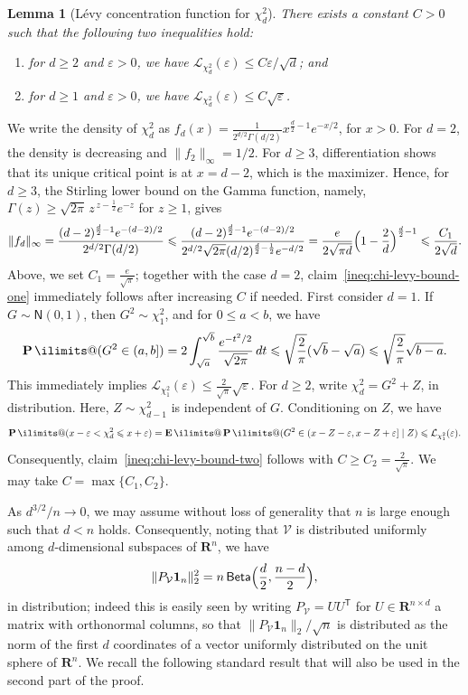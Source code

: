 \documentclass[11pt, letterpaper, hidelinks]{article}
\makeatletter
\renewcommand{\proofname}{\textit{\textbf{Proof}}}
\renewenvironment{proof}[1][\proofname]{\par\pushQED{\qed}\normalfont \topsep6\p@\@plus6\p@\relax\trivlist\item[\hskip\labelsep#1\@addpunct{}]\ignorespaces}{\popQED\endtrivlist\@endpefalse}
\newcommand{\R}{\mathbf R}
\newcommand{\cL}{\mathcal{L}}
\newcommand{\cV}{\mathcal{V}}
\newcommand{\1}{\mathbf 1}
\newcommand{\eps}{\varepsilon}
\renewcommand{\leq}{\leqslant}
\renewcommand{\geq}{\geqslant}
\newcommand{\T}{\mathsf{T}}
\newcommand{\E}{\operatorname*{\mathbf{E}}\ilimits@}
\renewcommand{\P}{\operatorname*{\mathbf{P}}\ilimits@}
\theoremstyle{plain}
\newtheorem{lemma}{Lemma}[section]
\theoremstyle{definition}
\newcommand{\Normal}[2]{\mathsf{N}\left(#1, #2\right)}
\newcommand{\defn}{=}
\makeatother
\begin{document}
\begin{lemma}[Lévy concentration function for $\chi^2_d$]
\label{lem:chi-levy-concentration-function}
	There exists a constant $C > 0$ such that the following two inequalities hold:
	\begin{enumerate}[label=(\roman*)]
	\item \label{ineq:chi-levy-bound-one} for $d \geq 2$ and $\eps > 0$, we have $\cL_{\chi^2_d}(\eps) \leq C \eps/\sqrt{d}$; and 
	\item \label{ineq:chi-levy-bound-two} for $d \geq 1$ and $\eps > 0$, we have $\cL_{\chi^2_d}(\eps) \leq C \sqrt{\eps}$. 
	\end{enumerate} 
\end{lemma}
\begin{proof}
	We write the density of $\chi^2_d$ as $f_d(x)=\tfrac{1}{2^{d/2}\Gamma(d/2)}x^{\frac d2-1}e^{-x/2}$, for $x > 0$. 
	For $d=2$, the density is decreasing and $\|f_2\|_\infty=1/2$. For $d\geq3$, differentiation shows that its unique critical point is at $x=d-2$, which is the maximizer. 
	Hence, for $d\geq3$, the Stirling lower bound on the Gamma function, namely, $\Gamma(z)\geq \sqrt{2\pi}\, z^{\,z-\frac12}e^{-z}$ for $z\geq 1$, gives
	\[
	\|f_d\|_\infty
	= \frac{(d-2)^{\frac d2-1}e^{-(d-2)/2}}{2^{d/2}\Gamma(d/2)}
	\leq
	\frac{(d-2)^{\frac d2-1}e^{-(d-2)/2}}{2^{d/2}\sqrt{2\pi}(d/2)^{\frac d2-\frac12}e^{-d/2}}
	=
	\frac{e}{2\sqrt{\pi d}}
	\Bigl(1-\frac{2}{d}\Bigr)^{\frac d2-1}
	\leq \frac{C_1}{2\sqrt{d}}.
	\]
	Above, we set $C_1 = \tfrac{e}{\sqrt{\pi}}$; together with the case $d=2$, claim~\ref{ineq:chi-levy-bound-one} immediately follows after increasing $C$ if needed. 
	First consider $d=1$. If $G\sim \Normal{0}{1}$, then $G^2\sim \chi^2_1$, and for $0 \leq a < b$, we have 
\[
\P(G^2\in (a, b])
=2\int_{\sqrt a}^{\sqrt b}\frac{e^{-t^2/2}}{\sqrt{2\pi}}\,dt
\leq \sqrt{\frac{2}{\pi}}(\sqrt b-\sqrt a)
\leq \sqrt{\frac{2}{\pi}}\sqrt{b-a}.
\]
This immediately implies $\cL_{\chi^2_1}(\varepsilon) \leq \frac{2}{\sqrt{\pi}}\sqrt{\varepsilon}$. 
For $d \geq 2$, write $\chi^2_d = G^2 + Z$, in distribution. Here, $Z\sim \chi^2_{d-1}$ is independent of $G$. Conditioning on $Z$,
we have 
\[
\P(x -\eps < \chi^2_d \leq x+\eps)
=\E \P(G^2\in (x-Z-\eps, x -Z +\eps]\mid Z ) 
\leq \cL_{\chi^2_1}(\eps). 
\]
Consequently, claim~\ref{ineq:chi-levy-bound-two} follows with $C \geq C_2 \defn \frac{2}{\sqrt{\pi}}$. 
We may take $C = \max\{C_1, C_2\}$. 
\end{proof}

As $d^{3/2}/n\to 0$, we may assume without loss of generality that $n$ is large enough such that $d<n$ holds.
Consequently, noting that $\cV$ is distributed uniformly among $d$-dimensional subspaces of $\R^n$, we 
have 
\[
\|P_{\cV} \mathbf{1}_n\|_2^2 = n \, \mathsf{Beta}\Bigl(\frac d2,\frac{n-d}{2}\Bigr),
\]
in distribution; indeed this is easily seen by writing $P_\cV = U U^\T$ for $U \in \R^{n\times d}$ a matrix with orthonormal columns, 
so that $\|P_{\cV} \mathbf{1}_n\|_2/\sqrt n$ is distributed as the norm of the first $d$ coordinates of a vector uniformly distributed on the unit sphere of $\R^n$. We recall the following standard result that will also be used in the second part of the proof.
\end{document}
